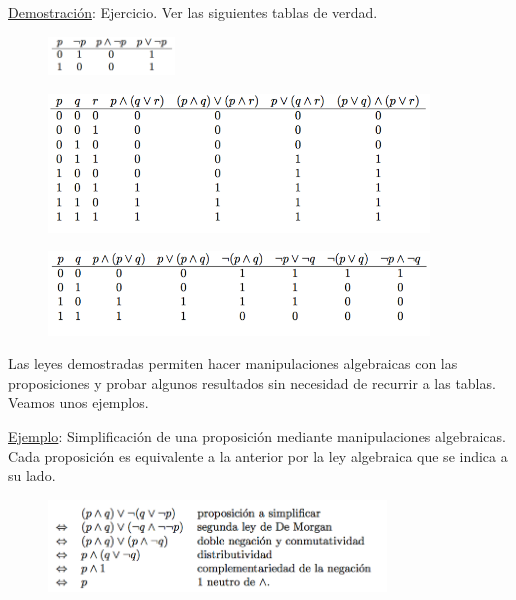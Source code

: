 \underline{Demostración}: Ejercicio. Ver las siguientes tablas de verdad. 

\begin{figure}[H] 
		\centering
		\includegraphics[width=0.3\textwidth]{imagenes/apendices/APENDICESIM25.png}
	\end{figure}
\begin{figure}[H] 
		\centering
		\includegraphics[width=0.9\textwidth]{imagenes/apendices/APENDICESIM26.png}
	\end{figure}
\begin{figure}[H] 
		\centering
		\includegraphics[width=0.9\textwidth]{imagenes/apendices/APENDICESIM27.png}
	\end{figure}
\rightline{$\Box$}


Las leyes demostradas permiten hacer manipulaciones algebraicas con las proposiciones y probar algunos resultados sin necesidad de recurrir a las tablas. Veamos unos ejemplos.

\underline{Ejemplo}: Simplificación de una proposición mediante manipulaciones algebraicas. Cada proposición es equivalente a la anterior por la ley algebraica que se indica a su lado.

\begin{figure}[H] 
		\centering
		\includegraphics[width=0.8\textwidth]{imagenes/apendices/APENDICESIM28.png}
	\end{figure}

